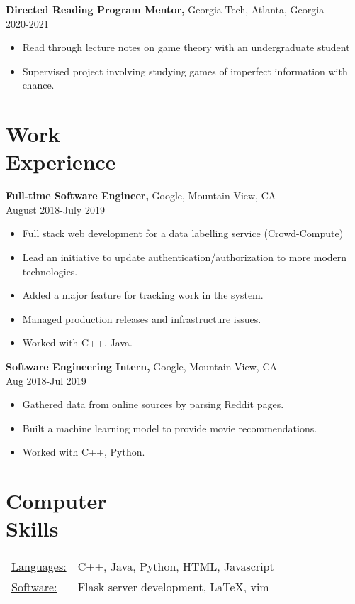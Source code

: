 \documentclass[margin]{res}
\begin{document}
\begin{resume}
       {\bf Directed Reading Program Mentor,} Georgia Tech, Atlanta, Georgia     \\         2020-2021 
        \begin{itemize} \itemsep -2pt
            \item Read through lecture notes on game theory with an undergraduate student
          \item Supervised project involving studying games of imperfect information with chance.
		 \end{itemize}

 \section{Work\\ Experience}
 {\bf Full-time Software Engineer,} Google, Mountain View, CA \\ August 2018-July 2019
 \begin{itemize} \itemsep -2pt  %
 \item Full stack web development for a data labelling service (Crowd-Compute)
 \item Lead an initiative to update authentication/authorization to more modern technologies.
 \item Added a major feature for tracking work in the system.
 \item Managed production releases and infrastructure issues.
 \item Worked with C++, Java.
 \end{itemize}
 
{\bf Software Engineering Intern,} Google, Mountain View, CA \\ Aug 2018-Jul 2019
\begin{itemize} \itemsep -2pt %
\item Gathered data from online sources by parsing Reddit pages.
\item Built a machine learning model to provide movie recommendations.
\item Worked with C++, Python.
\end{itemize}

\section{Computer \\ Skills}
   \begin{tabular}{l p{3in}}
    \underline{Languages:} & C++, Java, Python, HTML, Javascript \\

     \underline{Software:} & Flask server development, \LaTeX, vim
 \end{tabular}

\end{resume} 
\end{document}
